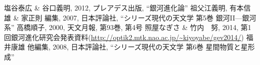 \begin{thebibliography}{99}
\begin{multicols}{2}
{
	塩谷泰広 \& 谷口義明, 2012, プレアデス出版, ``銀河進化論''
	祖父江義明, 有本信雄 \& 家正則 編集, 2007, 日本評論社, ``シリーズ現代の天文学 第5巻 銀河II—銀河系''
	高橋順子, 2000, 天文月報, 第93巻, 第4号
	照屋なぎさ \& 竹内　努, 2014, 第1回銀河進化研究会発表資料(\url{http://optik2.mtk.nao.ac.jp/~kiyoyabe/gev2014/})
	福井康雄 他編集, 2008, 日本評論社, ``シリーズ現代の天文学 第6巻 星間物質と星形成''
}
\end{multicols}
\end{thebibliography}

%

